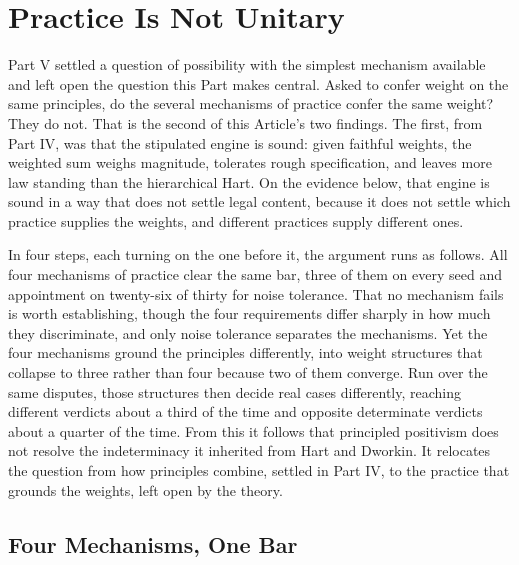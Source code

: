 \section{Practice Is Not Unitary}

Part V settled a question of possibility with the simplest mechanism
available and left open the question this Part makes central. Asked to
confer weight on the same principles, do the several mechanisms of
practice confer the same weight? They do not. That is the second of
this Article's two findings. The first, from Part IV, was that the stipulated engine is sound: given
faithful weights, the weighted sum weighs magnitude, tolerates rough
specification, and leaves more law standing than the hierarchical Hart. On the
evidence below, that engine is sound in a way
that does not settle legal content, because it does not settle which
practice supplies the weights, and different practices supply different
ones.

In four steps, each turning on the one before it, the argument runs as
follows. All four mechanisms of practice clear the same bar, three of them on
every seed and appointment on twenty-six of thirty for noise tolerance. That no
mechanism fails is worth establishing, though the four requirements differ
sharply in how much they discriminate, and only noise tolerance separates the
mechanisms. Yet the four mechanisms ground the principles
differently, into weight structures that collapse to three rather than four
because two of them converge. Run over the same disputes, those structures then decide real cases
differently, reaching different verdicts about a third of the time and
opposite determinate verdicts about a quarter of the time. From
this it follows that principled positivism does not resolve the
indeterminacy it inherited from Hart and Dworkin. It relocates the question from how principles combine, settled in
Part IV, to the practice that grounds the weights, left open by the
theory.

\subsection{Four Mechanisms, One Bar}

